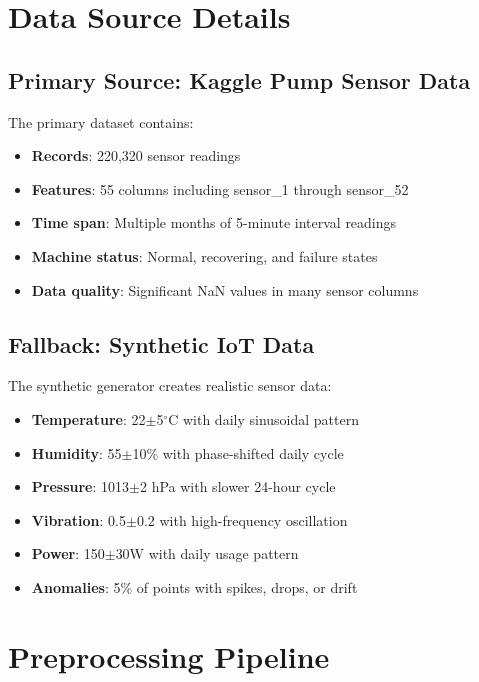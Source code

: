 \documentclass[12pt,a4paper]{report}
\begin{document}
\section{Data Source Details}

\subsection{Primary Source: Kaggle Pump Sensor Data}

The primary dataset contains:
\begin{itemize}
    \item \textbf{Records}: 220,320 sensor readings
    \item \textbf{Features}: 55 columns including sensor\_1 through sensor\_52
    \item \textbf{Time span}: Multiple months of 5-minute interval readings
    \item \textbf{Machine status}: Normal, recovering, and failure states
    \item \textbf{Data quality}: Significant NaN values in many sensor columns
\end{itemize}

\subsection{Fallback: Synthetic IoT Data}

The synthetic generator creates realistic sensor data:
\begin{itemize}
    \item \textbf{Temperature}: 22$\pm$5$^\circ$C with daily sinusoidal pattern
    \item \textbf{Humidity}: 55$\pm$10\% with phase-shifted daily cycle
    \item \textbf{Pressure}: 1013$\pm$2 hPa with slower 24-hour cycle
    \item \textbf{Vibration}: 0.5$\pm$0.2 with high-frequency oscillation
    \item \textbf{Power}: 150$\pm$30W with daily usage pattern
    \item \textbf{Anomalies}: 5\% of points with spikes, drops, or drift
\end{itemize}

\section{Preprocessing Pipeline}
\end{document}
